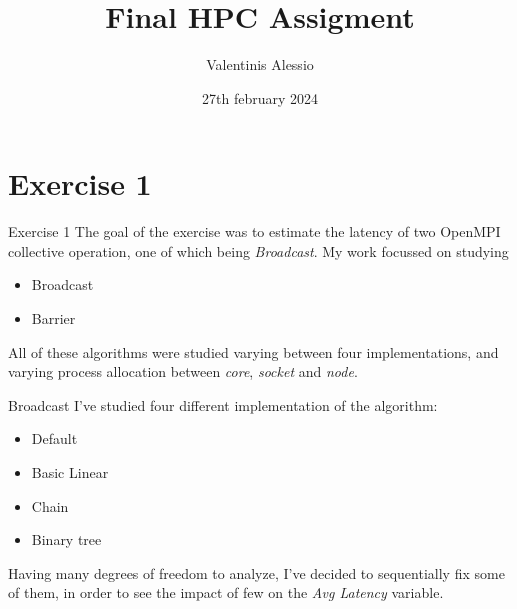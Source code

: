 \documentclass[11pt]{beamer}
\title{Final HPC Assigment}
\author{Valentinis Alessio}
\institute{Università degli Studi di Trieste}
\date{27th february 2024}
\begin{document}
\begin{frame}
	\maketitle
\end{frame}

\section{Exercise 1}
\begin{frame}{Exercise 1}
	The goal of the exercise was to estimate the latency of two OpenMPI collective operation, one of which being \textit{Broadcast}. My work focussed on studying
	\begin{itemize}
		\item Broadcast\\
		\item Barrier
	\end{itemize}
	All of these algorithms were studied varying between four implementations, and varying process allocation between \textit{core}, \textit{socket} and \textit{node}.
\end{frame}

\begin{frame}{Broadcast}
	I've studied four different implementation of the algorithm:
	\begin{itemize}
		\item Default
		\item Basic Linear
		\item Chain
		\item Binary tree
	\end{itemize}
	Having many degrees of freedom to analyze, I've decided to sequentially fix some of them, in order to see the impact of few on the \textit{Avg Latency} variable.
\end{frame}
\end{document}
